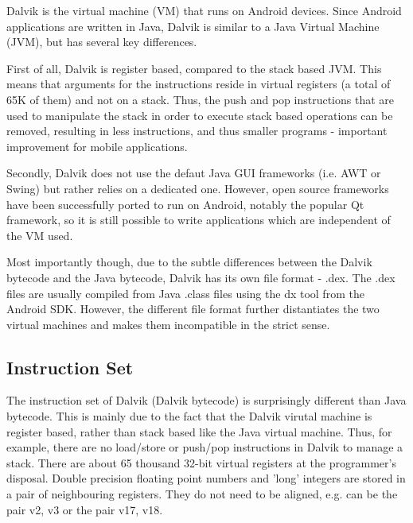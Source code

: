 \documentclass[parskip]{cs4rep}
\begin{document}
Dalvik is the virtual machine (VM) that runs on Android devices. Since Android applications are written in Java, Dalvik is similar to a Java Virtual Machine (JVM), but has several key differences.

First of all, Dalvik is register based, compared to the stack based JVM. This means that arguments for the instructions reside in virtual registers (a total of 65K of them) and not on a stack. Thus, the push and pop instructions that are used to manipulate the stack in order to execute stack based operations can be removed, resulting in less instructions, and thus smaller programs - important improvement for mobile applications.

Secondly, Dalvik does not use the defaut Java GUI frameworks (i.e. AWT or Swing) but rather relies on a dedicated one. However, open source frameworks have been successfully ported to run on Android, notably the popular Qt framework, so it is still possible to write applications which are independent of the VM  used.

Most importantly though, due to the subtle differences between the Dalvik bytecode and the Java bytecode, Dalvik has its own file format - .dex. The .dex files are usually compiled from Java .class files using the dx tool from the Android SDK. However, the different file format further distantiates the two virtual machines and makes them incompatible in the strict sense.

\subsection{Instruction Set} \label{sec:DalvikInstructionSet}

The instruction set of Dalvik (Dalvik bytecode) is surprisingly different than Java bytecode. This is mainly due to the fact that the Dalvik virutal machine is register based, rather than stack based like the Java virtual machine. Thus, for example, there are no load/store or push/pop instructions in Dalvik to manage a stack. There are about 65 thousand 32-bit virtual registers at the programmer's disposal. Double precision floating point numbers and 'long' integers are stored in a pair of neighbouring registers. They do not need to be aligned, e.g. can be the pair {v2, v3} or the pair {v17, v18}.
\end{document}

